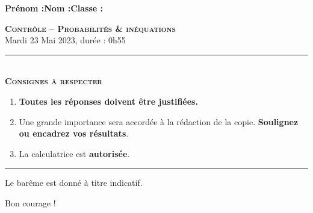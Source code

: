 \documentclass[11pt]{article}
\begin{document}
\textbf{Prénom :}\hfill\textbf{Nom :}\hfill\textbf{Classe :}\\[5mm]
\begin{center}
\textbf{\LARGE \textsc{Contrôle -- Probabilités \& inéquations}}\\[2mm]

{\large Mardi 23 Mai 2023, durée : 0h55}\\[1mm]
\noindent\rule{8cm}{0.4pt}\\[1mm]
\textbf{\textsc{Consignes à respecter}}
\begin{enumerate}[label=\textbf{\arabic*/}]
\item \textbf{Toutes les réponses doivent être justifiées.}
\item Une grande importance sera accordée à la rédaction de la
  copie. \textbf{Soulignez ou encadrez vos résultats}.
\item La calculatrice est \textbf{autorisée}.
    \end{enumerate}
\noindent\rule{12cm}{0.4pt}
\end{center}

\vspace{2mm}
\noindent Le barême est donné à titre indicatif.
\vspace{2mm}
\begin{center}
  Bon courage !
\end{center}

%
%
%
%
%
%
\end{document}
